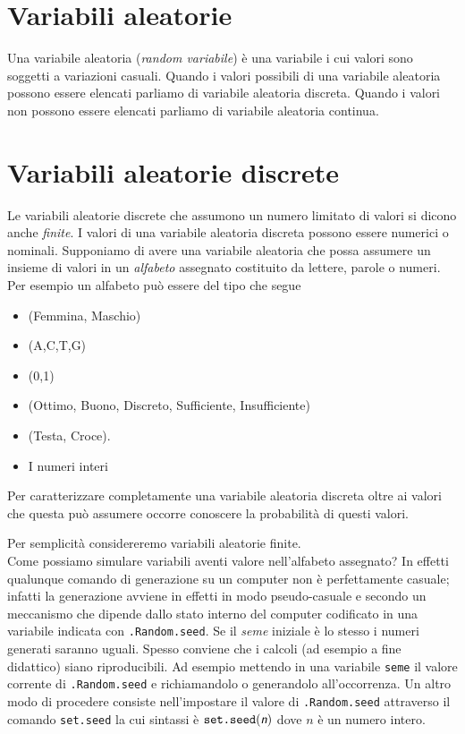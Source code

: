 \documentclass[onecolumn,12pt]{book}
\newcommand{\varia}[1]{\textsl{\textsf{#1}}}
\begin{document}
\section{Variabili aleatorie}
Una variabile aleatoria (\emph{random variabile}) \`e
 una variabile i cui valori sono soggetti a variazioni casuali. Quando i valori possibili di una variabile aleatoria  possono essere elencati parliamo di variabile aleatoria discreta. Quando i valori non possono essere elencati parliamo di variabile aleatoria continua.

\section{Variabili aleatorie discrete}
Le variabili aleatorie  discrete che  assumono un numero limitato di valori si dicono anche \emph{finite}.  I valori di una variabile aleatoria discreta possono essere numerici o nominali.
 Supponiamo di avere una variabile aleatoria che possa assumere un insieme di valori in  un \emph{alfabeto} assegnato costituito da lettere, parole o numeri. Per esempio un alfabeto pu\`o essere del tipo che segue
\begin{itemize}
\item{}(Femmina, Maschio)
\item{}(A,C,T,G)
\item{} (0,1)
\item{}(Ottimo, Buono, Discreto, Sufficiente, Insufficiente)
\item{} (Testa, Croce).
\item{} I numeri interi
\end{itemize}
Per caratterizzare completamente una variabile aleatoria discreta oltre ai valori che questa pu\`o  assumere occorre conoscere la probabilit\`a  di questi valori.


Per semplicit\`a considereremo variabili aleatorie finite.\\
Come possiamo simulare variabili aventi valore nell'alfabeto assegnato?
In effetti qualunque comando di generazione su un computer non \`e perfettamente casuale; infatti la generazione avviene in effetti in modo pseudo-casuale e  secondo un meccanismo che dipende dallo stato interno del computer codificato in una variabile indicata con \texttt{.Random.seed}. Se il {\it seme} iniziale \`e lo stesso i numeri generati saranno uguali. Spesso conviene che i calcoli (ad esempio a fine didattico) siano riproducibili. Ad esempio mettendo in una variabile \texttt{seme} il valore corrente di \texttt{.Random.seed} e richiamandolo o generandolo all'occorrenza.  
Un altro modo di procedere consiste nell'impostare il valore di 
\texttt{.Random.seed} attraverso il comando 
\texttt{set.seed}  la cui sintassi \`e 
$\texttt{set.seed}(\varia{n})$ dove $n$ \`e un numero intero.
 
\end{document}
